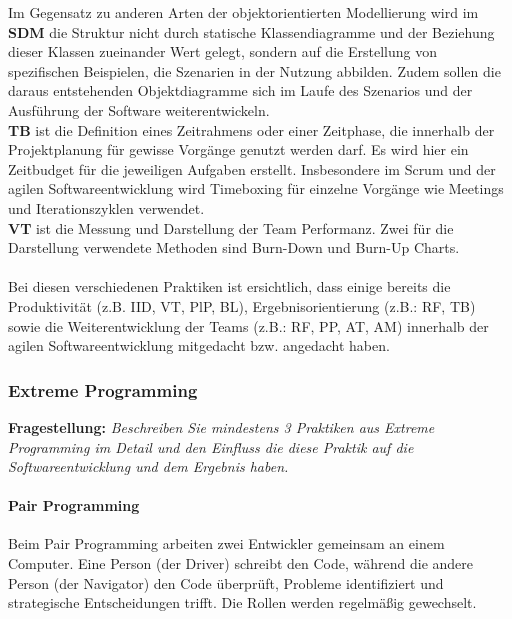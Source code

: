 Im Gegensatz zu anderen Arten der objektorientierten Modellierung wird im \textbf{SDM}
die Struktur nicht durch statische Klassendiagramme und der Beziehung dieser Klassen zueinander Wert gelegt,
sondern auf die Erstellung von spezifischen Beispielen, die Szenarien in der Nutzung abbilden.
Zudem sollen die daraus entstehenden Objektdiagramme sich im Laufe des Szenarios und der Ausführung
der Software weiterentwickeln. \cite{Wautelet2017-rv} \\

\textbf{TB} ist die Definition eines Zeitrahmens oder einer Zeitphase,
die innerhalb der Projektplanung für gewisse Vorgänge genutzt werden darf. Es wird hier ein Zeitbudget für die jeweiligen Aufgaben erstellt.
Insbesondere im Scrum und der agilen Softwareentwicklung wird Timeboxing für
einzelne Vorgänge wie Meetings und Iterationszyklen verwendet. \cite{Miranda2011-yh} \\

\textbf{VT} ist die Messung und Darstellung der Team Performanz. Zwei für die Darstellung verwendete Methoden
sind Burn-Down und Burn-Up Charts. \\
\cite{Al-Sabbagh2018-bd} \\

Bei diesen verschiedenen Praktiken ist ersichtlich, dass einige bereits die Produktivität (z.B. IID, VT, PlP, BL),
Ergebnisorientierung (z.B.: RF, TB) sowie die Weiterentwicklung der Teams (z.B.: RF, PP, AT, AM) innerhalb der
agilen Softwareentwicklung mitgedacht bzw. angedacht haben.

\subsubsection{Extreme Programming}

\textbf{Fragestellung:} \textit{Beschreiben Sie mindestens 3 Praktiken aus Extreme Programming im Detail und den Einfluss
die diese Praktik auf die Softwareentwicklung und dem Ergebnis haben.}

\paragraph{Pair Programming}
Beim Pair Programming arbeiten zwei Entwickler gemeinsam an einem Computer. Eine Person (der Driver) schreibt den Code, 
während die andere Person (der Navigator) den Code überprüft, Probleme identifiziert und strategische Entscheidungen trifft. 
Die Rollen werden regelmäßig gewechselt. 

